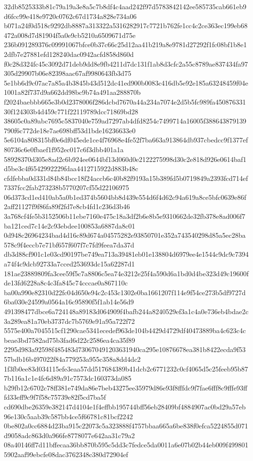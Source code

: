 \documentclass[11pt,a4paper]{article}
\begin{document}
{32db8525333b81c79a19a3e8a5c7b8df4c4aad242f97d5783842142ee585735cab661eb9d6fcc99e418e9720c0762c67d1734a828e734a06
b071a24f0d518c9292db8887a313322a5316282917c7721b762fe1cc4c2ce363ec199eb68472a008d7d81904f5a0e9cb5210a6509671d75e
236b091289376c09991067bfce0b37c66c25d12aa41b219a8e9781d27292f1fc08bf1b8e12dfb7e27881efd128240dac0942acfd858d860d
f0c28d324fc45c3092d71deb9dd8e9fb4211d7dc131f1ab8d3cfc2a55c8789ae837434fa97305d29907b06e82398aac67af9980643fb3d75
5e1bb6d9c07ac7a85a4b3845b43d512dc41ed900b0083c416db5e92e185a63248459f04e1001a82f737d9a662dd98bc9b74a491aa288870b
f2024baebbb665e3b0d2378006f286dcbd7670a44a234a7074e2d5b5fc989fa45087633130f124303b4d459c771f22119789dcc71869bd28
38605c0a89abc7695c5837040e759ad7297ab4dfd8254c7499714a16005f388643879139790f6c772de18e7ae698bff53d1bde16236633e0
5e6104a808315bf0e6df045ede1ce4f76968e4fe52f7ba663a913864db937cbedcc9f1377ef80736c6e0fbaef1f952ec017c6f3dbb401a1a
58928370d305e8ad2c6b924ee0644bf13d060d0e2122275998d30c2e818d926e0614baf1d5be3c4f6542992229fdaa4412715922d883b48c
cfdfebba0d331d84b84bcc18f24accb6c40b82f9193a15b389fd5b0719849a2393fcd714ef7337fcc2fab273238b5770207cf55d22106975
06d373cd1ed410ab5a0b1ed374b5604bb8d439e554d6f4d62c94a619a8ce5bfc0639e86f2aff21127f9f86fa89f2fd7e8cb4fd1c236d3b46
3a768cf4fe5b3152506b11ebe7160e475c18a3df2b6e8b5e9310662de32fb378e8ad006f7ba121ced7c14e2c93ebdee100853a6887da8c01
0d948c26964234bad4d16c89d674a04575282e93850701e352a743540298d85a5ec28ba578c9f4eccb7e71bf657f607f7c7fd9feea7da37d
db3d88cf901c1e03cd90197be749ea713a39481eb01e138804d6979ee4e1544c9dc9c7394a74f4c9dcb92733a7cced253693dc15a62287d1
181ae23889809fa3cee59f5c7a8806c5ea74e3212e25f4a590d6a1bd0d4be323d49c19600fde13fd6228a8c4c3fa845c74cccae0a867110c
ba00a990e82310d22fc04d650e94c2c453c1302e0ba1661207f114e9f54ce273b5df9727d6ba030e24599a0564a16c95890f5f1ab14e56d9
491398477dbce6a724148a89183d064909f4bafb244a8240529ef3a1c4a0e736eb4bdae2c3a289ea81a70eb3737dc7b5769e91a95a722f72
5575e400a7045515cf1290cae5341ecedef963de104b4429d4729df40473889ba4c623c4cbeae3bd7582ad75b3fad6d22c2586ea4ca35f89
2295d983a92598f485483d730670491203631940ca295e10876678ea381b8422ecda9f5357bdb16b497022f84a779253a955c358a8dd4dc2
1f3fb0ee83d034115efe3eaa57dd517684389b41dcb2c6771232c0cf4065d5c25feeb95b877b116a1c1e4fc6d89a91c7573dc160373da085
b29fb12c6702c78ff381e749da86e7beb43275ee35979d86e93f8fffdc9f7fae6fff8c9fffe93fffd33eff9c9f7f58c75739e82f5cd7ba5f
cd690dbe26359e382147d4104e1f4effbb195744bff56eb28409bf4884907ac0bd29a57eb96e130c5aab39c587bb4ce5f66781c81bcf2242
0be802a0cc6884d23ba915c22073c5a323888f4757bbaa665a6be838f0efca5224855d071d9058adc863d0a966fe8778077e642aa31c79a2
08a40146ff7d11bffecaa36bb870b595c5dd3c7fedce5da0011a6e07b02b44eb009f4998015902aaf99ebcfe08dac3762348c380d72904ef
}
\end{document}
